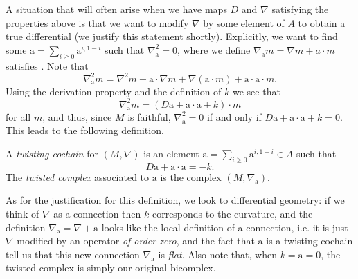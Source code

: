         A situation that will often arise when we have maps $D$ and $\nabla$ satisfying the properties above is that we want to modify $\nabla$ by some element of $A$ to obtain a true differential (we justify this statement shortly).
        Explicitly, we want to find some $\mathrm{a}=\sum_{i\geqslant0}\mathrm{a}^{i,1-i}$ such that $\nabla_\mathrm{a}^2=0$, where we define $\nabla_\mathrm{a}m = \nabla m+a\cdot m$ satisfies .
        Note that
        \[
            \nabla_\mathrm{a}^2m = \nabla^2m+\mathrm{a}\cdot\nabla m+\nabla(\mathrm{a}\cdot m)+\mathrm{a}\cdot\mathrm{a}\cdot m.
        \]
        Using the derivation property and the definition of $k$ we see that
        \[
            \nabla_\mathrm{a}^2m = (D\mathrm{a}+\mathrm{a}\cdot\mathrm{a}+k)\cdot m
        \]
        for all $m$, and thus, since $M$ is faithful, $\nabla_\mathrm{a}^2=0$ if and only if $D\mathrm{a}+\mathrm{a}\cdot\mathrm{a}+k=0$.
        This leads to the following definition.
        \begin{definition}
            A \textit{twisting cochain} for $(M,\nabla)$ is an element $\mathrm{a}=\sum_{i\geqslant0}\mathrm{a}^{i,1-i}\in A$ such that
            \[
                D\mathrm{a}+\mathrm{a}\cdot\mathrm{a}=-k.
            \]
            The \textit{twisted complex} associated to $\mathrm{a}$ is the complex $(M,\nabla_\mathrm{a})$.
        \end{definition}

        As for the justification for this definition, we look to differential geometry: if we think of $\nabla$ as a connection then $k$ corresponds to the curvature, and the definition $\nabla_\mathrm{a}=\nabla+\mathrm{a}$ looks like the local definition of a connection, i.e. it is just $\nabla$ modified by an operator \textit{of order zero}, and the fact that $\mathrm{a}$ is a twisting cochain tell us that this new connection $\nabla_\mathrm{a}$ is \textit{flat}.
        Also note that, when $k=\mathrm{a}=0$, the twisted complex is simply our original bicomplex.

        \bigskip

